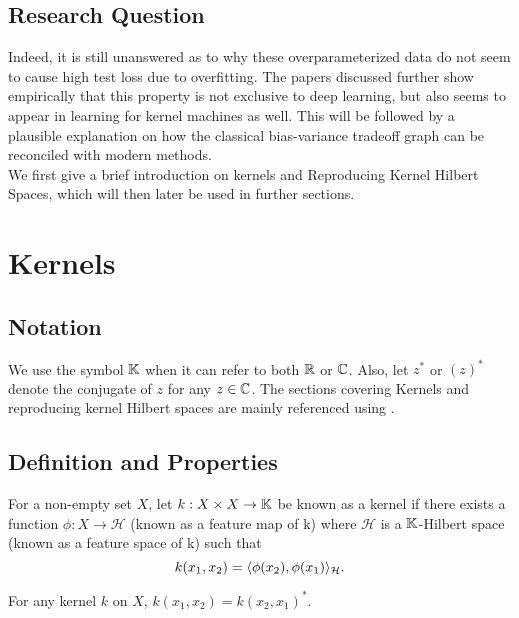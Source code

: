 \documentclass[twoside]{memoir}
\begin{document}
\section{Research Question}

Indeed, it is still unanswered as to why these overparameterized data do not seem to cause high test loss due to overfitting. The papers discussed further show empirically that this property is not exclusive to deep learning, but also seems to appear in learning for kernel machines as well. This will be followed by a plausible explanation on how the classical bias-variance tradeoff graph can be reconciled with modern methods.\\
We first give a brief introduction on kernels and Reproducing Kernel Hilbert Spaces, which will then later be used in further sections.

\chapter{Kernels}
	\section{Notation}
	We use the symbol $\mathbb{K}$  when it can refer to both $\mathbb{R}$ or $\mathbb{C}$. Also, let $z^*$ or $(z)^*$ denote the conjugate of $z$ for any $z \in \mathbb{C}$.
	The sections covering Kernels and reproducing kernel Hilbert spaces are mainly referenced using \cite{steinwartSVM}.
	
	\section{Definition and Properties}
	\begin{defn}
		For a non-empty set $X$, let $k: X \times X \rightarrow \mathbb{K}$ be known as a kernel if there exists a function $\phi: X \rightarrow \mathcal{H}$ (known as a feature map of k) where $\mathcal{H}$ is a $\mathbb{K}$-Hilbert space (known as a feature space of k) such that
		\begin{equation}
		k(x_1, x_2) = \langle\phi(x_2), \phi(x_1)\rangle_\mathcal{H}.
		\end{equation}
	\end{defn}
	
	\begin{lem} \label{lem:kernelSymm}
		For any kernel $k$ on $X$, $k(x_1, x_2) = k(x_2, x_1)^*$.
	\end{lem}
	
\end{document}
